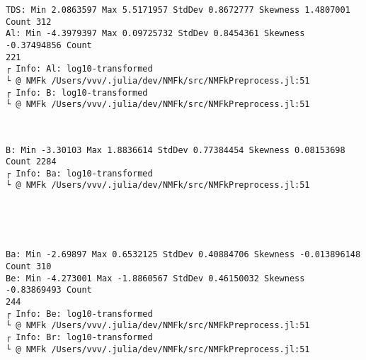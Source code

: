 \documentclass[11pt]{article}
\begin{document}
    \begin{Verbatim}[commandchars=\\\{\}]
TDS: Min 2.0863597 Max 5.5171957 StdDev 0.8672777 Skewness 1.4807001 Count 312
Al: Min -4.3979397 Max 0.09725732 StdDev 0.8454361 Skewness -0.37494856 Count
221
┌ Info: Al: log10-transformed
└ @ NMFk /Users/vvv/.julia/dev/NMFk/src/NMFkPreprocess.jl:51
┌ Info: B: log10-transformed
└ @ NMFk /Users/vvv/.julia/dev/NMFk/src/NMFkPreprocess.jl:51
    \end{Verbatim}

    \begin{center}
    \end{center}
    { \hspace*{\fill} \\}
    
    \begin{Verbatim}[commandchars=\\\{\}]
B: Min -3.30103 Max 1.8836614 StdDev 0.77384454 Skewness 0.08153698 Count 2284
┌ Info: Ba: log10-transformed
└ @ NMFk /Users/vvv/.julia/dev/NMFk/src/NMFkPreprocess.jl:51
    \end{Verbatim}

    \begin{center}
    \end{center}
    { \hspace*{\fill} \\}
    
    \begin{center}
    \end{center}
    { \hspace*{\fill} \\}
    
    \begin{Verbatim}[commandchars=\\\{\}]
Ba: Min -2.69897 Max 0.6532125 StdDev 0.40884706 Skewness -0.013896148 Count 310
Be: Min -4.273001 Max -1.8860567 StdDev 0.46150032 Skewness -0.83869493 Count
244
┌ Info: Be: log10-transformed
└ @ NMFk /Users/vvv/.julia/dev/NMFk/src/NMFkPreprocess.jl:51
┌ Info: Br: log10-transformed
└ @ NMFk /Users/vvv/.julia/dev/NMFk/src/NMFkPreprocess.jl:51
    \end{Verbatim}
\end{document}
